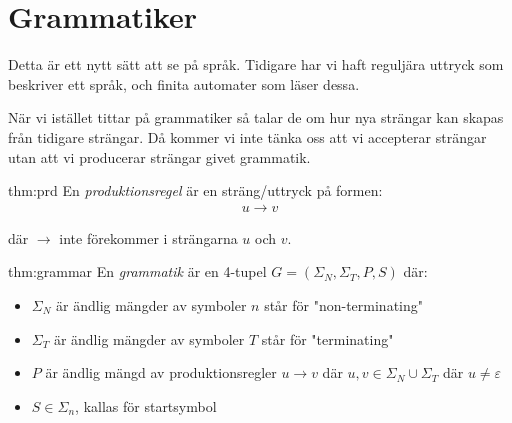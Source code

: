 \section{Grammatiker}\par
\noindent Detta är ett nytt sätt att se på språk. Tidigare har vi haft reguljära uttryck som beskriver ett språk, och finita automater som läser dessa.\par
\noindent När vi istället tittar på grammatiker så talar de om hur nya strängar kan skapas från tidigare strängar. Då kommer vi inte tänka oss att vi accepterar strängar utan att vi producerar strängar givet grammatik.
\par\bigskip
\begin{theo}[Produktionsregel]{thm:prd}
  En \textit{produktionsregel} är en sträng/uttryck på formen:
  \begin{equation*}
    \begin{gathered}
      u\to v
    \end{gathered}
  \end{equation*}\par
  \noindent där $\to$ inte förekommer i strängarna $u$ och $v$. 
\end{theo}
\par\bigskip
\begin{theo}[Grammatik]{thm:grammar}
  En \textit{grammatik} är en 4-tupel $G = (\Sigma_N,\Sigma_T,P,S)$ där:
  \begin{itemize}
    \item $\Sigma_N$ är ändlig mängder av symboler $n$ står för "non-terminating"
    \item $\Sigma_T$ är ändlig mängder av symboler $T$ står för "terminating"
    \item $P$ är ändlig mängd av produktionsregler $u\to v$ där $u,v\in \Sigma_N\cup\Sigma_T$ där $u\neq\varepsilon$
    \item $S\in\Sigma_n$, kallas för startsymbol
  \end{itemize}
\end{theo}
\par\bigskip
